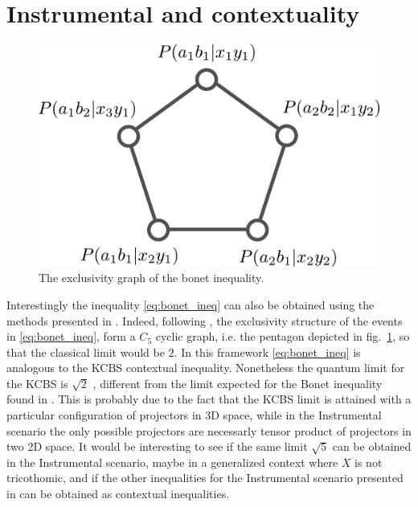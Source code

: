 \documentclass{article}
\begin{document}
\section*{Instrumental and contextuality}
\begin{figure}[h]
    \centering
    \includegraphics[width=.6\textwidth]{images/bonetexc.pdf}
    \caption{The exclusivity graph of the bonet inequality.}
    \label{fig:bonetexc}
\end{figure}
Interestingly the inequality \eqref{eq:bonet_ineq} can also be obtained using
the methods presented in \cite{cabello2014}.  Indeed, following
\cite{cabello2014}, the exclusivity structure of the events in
\eqref{eq:bonet_ineq}, form a $C_5$ cyclic graph, i.e. the pentagon depicted in
fig.~\ref{fig:bonetexc}, so that the classical limit would be $2$.
In this framework \eqref{eq:bonet_ineq} is analogous to the KCBS contextual
inequality.
Nonetheless the quantum limit for the KCBS is $\sqrt{2}$ \cite{cabello2014}, different
from the limit expected for the Bonet inequality found in \cite{himbeeck2018}.
This is probably due to the fact that the KCBS limit is attained with a
particular configuration of projectors in 3D space, while in the
Instrumental scenario the only possible projectors are necessarly tensor product of
projectors in two 2D space.
It would be interesting to see if the same limit $\sqrt{5}$ can be obtained in the
Instrumental scenario, maybe in a generalized context where $X$ is not
tricothomic, and if the other inequalities for the Instrumental scenario
presented in \cite{bonet2001} can be obtained as contextual inequalities.
\end{document}
